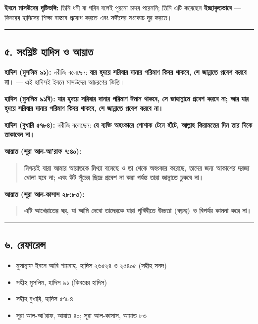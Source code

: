 \textbf{ইবনে মাসউদের দৃষ্টিভঙ্গি:} তিনি ধনী বা গরিব বলেই পুরনো চাদর পরেননি; তিনি এটি করেছেন \textbf{ইচ্ছাকৃতভাবে} — কিবরের হাদিসের শিক্ষা বাস্তবে প্রয়োগ করতে এবং সঙ্গীদের সংকোচ দূর করতে।

\medskip\hrule\medskip

\subsection*{৫. সংশ্লিষ্ট হাদিস ও আয়াত}

\textbf{হাদিস (মুসলিম ৯১):} নবীজি বলেছেন: \textbf{যার হৃদয়ে সরিষার দানার পরিমাণ কিবর থাকবে, সে জান্নাতে প্রবেশ করবে না।} — এই হাদিসই ইবনে মাসউদের আচরণের ভিত্তি।

\textbf{হাদিস (মুসলিম ৯১বি):} \textbf{যার হৃদয়ে সরিষার দানার পরিমাণ ঈমান থাকবে, সে জাহান্নামে প্রবেশ করবে না; আর যার হৃদয়ে সরিষার দানার পরিমাণ কিবর থাকবে, সে জান্নাতে প্রবেশ করবে না।}

\textbf{হাদিস (বুখারি ৫৭৮৪):} নবীজি বলেছেন: \textbf{যে ব্যক্তি অহংকারে পোশাক টেনে হাঁটে, আল্লাহ কিয়ামতের দিন তার দিকে তাকাবেন না।}

\textbf{আয়াত (সূরা আল-আ'রাফ ৭:৪০):}
\begin{quote}
\textbf{নিশ্চয়ই যারা আমার আয়াতকে মিথ্যা বলেছে ও তা থেকে অহংকার করেছে, তাদের জন্য আকাশের দরজা খোলা হবে না; এবং উট সূঁচের ছিদ্রে প্রবেশ না করা পর্যন্ত তারা জান্নাতে ঢুকবে না।}
\end{quote}

\textbf{আয়াত (সূরা আল-কাসাস ২৮:৮৩):}
\begin{quote}
\textbf{এটি আখেরাতের ঘর, যা আমি দেবো তাদেরকে যারা পৃথিবীতে উচ্চতা (বড়ত্ব) ও বিপর্যয় কামনা করে না।}
\end{quote}

\medskip\hrule\medskip

\subsection*{৬. রেফারেন্স}

\begin{itemize}
\item মুসান্নাফ ইবনে আবি শায়বাহ, হাদিস ২৬৫২৪ ও ২৫৪০৫ (সহীহ সনদ)
\item সহীহ মুসলিম, হাদিস ৯১ (কিবরের হাদিস)
\item সহীহ বুখারি, হাদিস ৫৭৮৪
\item সূরা আল-আ'রাফ, আয়াত ৪০; সূরা আল-কাসাস, আয়াত ৮৩
\end{itemize}


